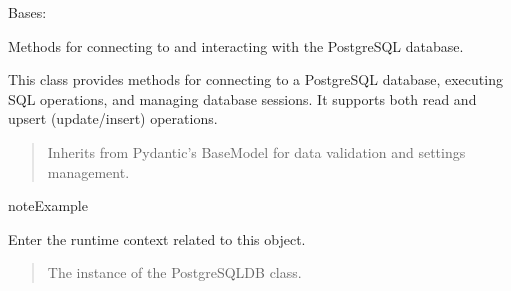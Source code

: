 \documentclass[letterpaper,10pt,english]{sphinxmanual}
\begin{document}
\begin{fulllineitems}
\label{\detokenize{src.database:src.database.postgres.PostgreSQLDB}}
\pysigstartsignatures
\pysigline
{}
\pysigstopsignatures
\sphinxAtStartPar
Bases: 

\sphinxAtStartPar
Methods for connecting to and interacting with the PostgreSQL database.

\sphinxAtStartPar
This class provides methods for connecting to a PostgreSQL database, executing SQL operations,
and managing database sessions. It supports both read and upsert (update/insert) operations.
\begin{quote}\begin{description}
\sphinxAtStartPar
{} \textendash{} Inherits from Pydantic’s BaseModel for data validation and settings management.

\end{description}\end{quote}

\begin{sphinxadmonition}{note}{Example}

\begin{sphinxVerbatim}[commandchars=\\\{\}]
  
 
     
\end{sphinxVerbatim}
\end{sphinxadmonition}

\begin{fulllineitems}
\label{\detokenize{src.database:src.database.postgres.PostgreSQLDB.__enter__}}
\pysigstartsignatures
\pysiglinewithargsret
{}
{}
{}
\pysigstopsignatures
\sphinxAtStartPar
Enter the runtime context related to this object.
\begin{quote}\begin{description}
\sphinxAtStartPar
The instance of the PostgreSQLDB class.


\end{description}
\end{quote}
\end{fulllineitems}
\end{fulllineitems}
\end{document}
